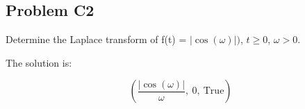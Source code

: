 \subsection{Problem C2} Determine the Laplace transform of f(t) = \(\left|{\cos{\left(\omega \right)}}\right|)\), \(t \geq 0\), \(\omega > 0\).

    \medskip
    The solution is:

    \smallskip
     \begin{equation}
         \left( \frac{\left|{\cos{\left(\omega \right)}}\right|}{\omega}, \  0, \  \text{True}\right)
     \end{equation}
